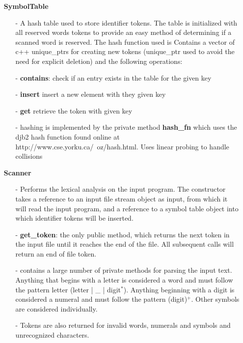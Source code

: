 \documentclass{article}
\begin{document}
    \begin{itemize}
        \item[]\textbf{SymbolTable} 
            \begin{itemize}
                \item[-] A hash table used to store identifier tokens. The table is initialized with all reserved words tokens to provide an easy method of determining if a scanned word is reserved. The hash function used is  Contains a vector of c++ unique\_ptrs for creating new tokens (unique\_ptr used to avoid the need for explicit deletion) and the following operations:
                \item[-] \textbf{contains}: check if an entry exists in the table for the given key
                \item[-] \textbf{insert} insert a new element with they given key
                \item[-] \textbf{get} retrieve the token with given key
                \item[-] hashing is implemented by the private method \textbf{hash\_fn} which uses the djb2 hash function found online at http://www.cse.yorku.ca/~oz/hash.html. Uses linear probing to handle collisions
            \end{itemize}

        \item[]\textbf{Scanner}
            \begin{itemize}
                \item[-] Performs the lexical analysis on the input program. The constructor takes a reference to an input file stream object as input, from which it will read the input program, and a reference to a symbol table object into which identifier tokens will be inserted. 
                \item[-] \textbf{get\_token}: the only public method, which returns the next token in the input file until it reaches the end of the file. All subsequent calls will return an end of file token.
                \item[-] contains a large number of private methods for parsing the input text. Anything that begins with a letter is considered a word and must follow the pattern letter (letter | \_ | digit$^*$). Anything beginning with a digit is considered a numeral and must follow the pattern (digit)$^+$. Other symbols are considered individually. 
                \item[-]Tokens are also returned for invalid words, numerals and symbols and unrecognized characters. 
            \end{itemize}


\end{itemize}
\end{document}
